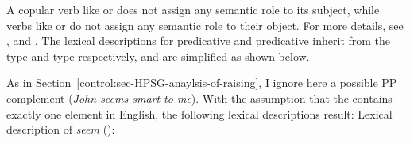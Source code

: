 A copular verb like  or  does not assign any semantic role to its subject, while
verbs like  or  do not assign any semantic role to their object. For
more details, see ,
\textcites[Section~2.2.7]{Mueller2002b}[]{MuellerPredication} and .  The lexical descriptions for predicative  and
predicative  inherit from the  type and 
type respectively, and are simplified as shown below. 

\largerpage[2]
As in Section~\ref{control:sec-HPSG-anaylsis-of-raising}, I ignore here a possible PP complement
(\textit{John seems smart to me}). With the assumption that the \subjl contains exactly one
  element in English, the following lexical descriptions result:
\eas
Lexical description of \emph{seem} ():\\
\zs

